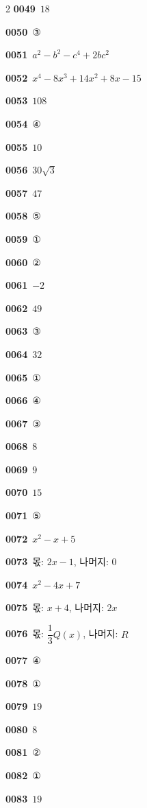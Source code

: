 \documentclass[10pt,a4paper]{article}
\begin{document}
\begin{multicols}{2}
\noindent\textbf{0049}\ $18$\par
\noindent\textbf{0050}\ ③\par
\noindent\textbf{0051}\ $a^2-b^2-c^4+2bc^2$\par
\noindent\textbf{0052}\ $x^4-8x^3+14x^2+8x-15$\par
\noindent\textbf{0053}\ $108$\par
\noindent\textbf{0054}\ ④\par
\noindent\textbf{0055}\ $10$\par
\noindent\textbf{0056}\ $30\sqrt{3}$\par
\noindent\textbf{0057}\ $47$\par
\noindent\textbf{0058}\ ⑤\par
\noindent\textbf{0059}\ ①\par
\noindent\textbf{0060}\ ②\par
\noindent\textbf{0061}\ $-2$\par
\noindent\textbf{0062}\ $49$\par
\noindent\textbf{0063}\ ③\par
\noindent\textbf{0064}\ $32$\par
\noindent\textbf{0065}\ ①\par
\noindent\textbf{0066}\ ④\par
\noindent\textbf{0067}\ ③\par
\noindent\textbf{0068}\ $8$\par
\noindent\textbf{0069}\ $9$\par
\noindent\textbf{0070}\ $15$\par
\noindent\textbf{0071}\ ⑤\par
\noindent\textbf{0072}\ $x^2-x+5$\par
\noindent\textbf{0073}\ 몫: $2x-1$, 나머지: $0$\par
\noindent\textbf{0074}\ $x^2-4x+7$\par
\noindent\textbf{0075}\ 몫: $x+4$, 나머지: $2x$\par
\noindent\textbf{0076}\ 몫: $\dfrac{1}{3}Q(x)$, 나머지: $R$\par
\noindent\textbf{0077}\ ④\par
\noindent\textbf{0078}\ ①\par
\noindent\textbf{0079}\ $19$\par
\noindent\textbf{0080}\ $8$\par
\noindent\textbf{0081}\ ②\par
\noindent\textbf{0082}\ ①\par
\noindent\textbf{0083}\ $19$\par

\end{multicols}
\end{document}
